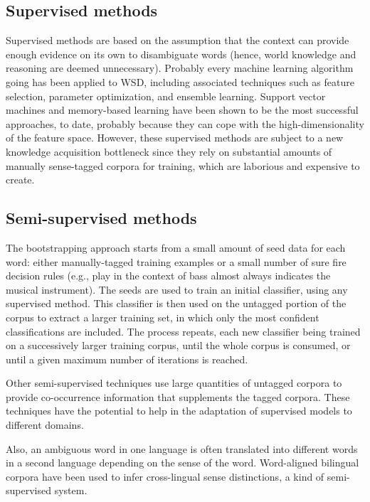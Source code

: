 \documentclass[11pt]{article}
\begin{document}
\subsection{Supervised methods}

Supervised methods are based on the assumption that the context can provide enough evidence on its own to disambiguate words (hence, world knowledge and reasoning are deemed unnecessary). Probably every machine learning algorithm going has been applied to WSD, including associated techniques such as feature selection, parameter optimization, and ensemble learning. Support vector machines and memory-based learning have been shown to be the most successful approaches, to date, probably because they can cope with the high-dimensionality of the feature space. However, these supervised methods are subject to a new knowledge acquisition bottleneck since they rely on substantial amounts of manually sense-tagged corpora for training, which are laborious and expensive to create.


\nocite{Schumacher:2007:FMS:2394705.2394742,Wang:2014:SWS:2562348.2562704}
\printbibliography
\endrefsection



\subsection{Semi-supervised methods}

The bootstrapping approach starts from a small amount of seed data for each word: either manually-tagged training examples or a small number of sure fire decision rules (e.g., play in the context of bass almost always indicates the musical instrument). The seeds are used to train an initial classifier, using any supervised method. This classifier is then used on the untagged portion of the corpus to extract a larger training set, in which only the most confident classifications are included. The process repeats, each new classifier being trained on a successively larger training corpus, until the whole corpus is consumed, or until a given maximum number of iterations is reached.

 Other semi-supervised techniques use large quantities of untagged corpora to provide co-occurrence information that supplements the tagged corpora. These techniques have the potential to help in the adaptation of supervised models to different domains.

Also, an ambiguous word in one language is often translated into different words in a second language depending on the sense of the word. Word-aligned bilingual corpora have been used to infer cross-lingual sense distinctions, a kind of semi-supervised system.
\end{document}
